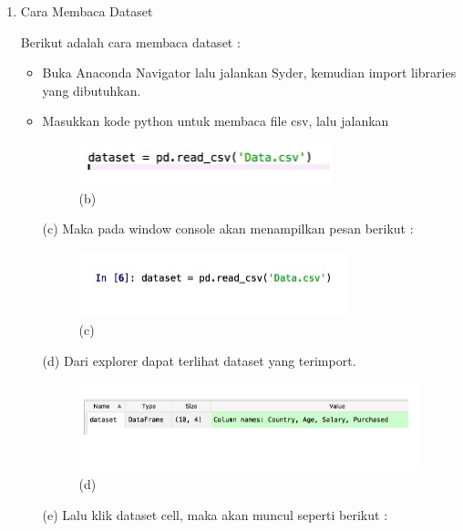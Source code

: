 \begin{enumerate}
\begin{itemize}
\par
\end{itemize}

\item Cara Membaca Dataset

Berikut adalah cara membaca dataset :
\begin{itemize}
\item Buka Anaconda Navigator lalu jalankan Syder, kemudian import libraries yang dibutuhkan.
\item Masukkan kode python untuk membaca file csv, lalu jalankan

\begin{figure}[ht]
\centering
\includegraphics[scale=0.5]{figures/AIP/y1.PNG}
\caption{(b)}
\label{contoh}
\end{figure}
\par (c) Maka pada window console akan menampilkan pesan berikut :
\begin{figure}[ht]
\centering
\includegraphics[scale=0.9]{figures/AIP/y2.PNG}
\caption{(c)}
\label{contoh}
\end{figure}
\par (d) Dari explorer dapat terlihat dataset yang terimport.
\begin{figure}[ht]
\centering
\includegraphics[scale=0.6]{figures/AIP/y3.PNG}
\caption{(d)}
\label{contoh}
\end{figure}
\par (e) Lalu klik dataset cell, maka akan muncul seperti berikut :
\begin{figure}[ht]
\centering

\end{figure}
\end{itemize}
\end{enumerate}
